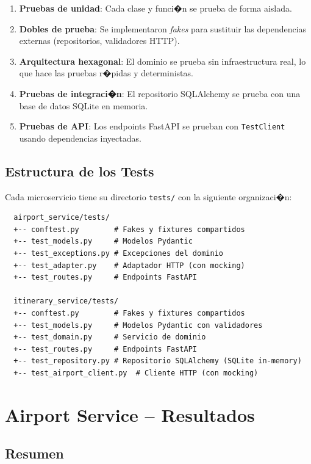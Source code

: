 \documentclass[12pt,a4paper]{article}
\begin{document}
\begin{enumerate}
  \item \textbf{Pruebas de unidad}: Cada clase y funci�n se prueba de forma aislada.
  \item \textbf{Dobles de prueba}: Se implementaron \textit{fakes} para sustituir
        las dependencias externas (repositorios, validadores HTTP).
  \item \textbf{Arquitectura hexagonal}: El dominio se prueba sin infraestructura
        real, lo que hace las pruebas r�pidas y deterministas.
  \item \textbf{Pruebas de integraci�n}: El repositorio SQLAlchemy se prueba con
        una base de datos SQLite en memoria.
  \item \textbf{Pruebas de API}: Los endpoints FastAPI se prueban con
        \texttt{TestClient} usando dependencias inyectadas.
\end{enumerate}

\subsection{Estructura de los Tests}

Cada microservicio tiene su directorio \texttt{tests/} con la siguiente organizaci�n:

\begin{verbatim}
  airport_service/tests/
  +-- conftest.py        # Fakes y fixtures compartidos
  +-- test_models.py     # Modelos Pydantic
  +-- test_exceptions.py # Excepciones del dominio
  +-- test_adapter.py    # Adaptador HTTP (con mocking)
  +-- test_routes.py     # Endpoints FastAPI

  itinerary_service/tests/
  +-- conftest.py        # Fakes y fixtures compartidos
  +-- test_models.py     # Modelos Pydantic con validadores
  +-- test_domain.py     # Servicio de dominio
  +-- test_routes.py     # Endpoints FastAPI
  +-- test_repository.py # Repositorio SQLAlchemy (SQLite in-memory)
  +-- test_airport_client.py  # Cliente HTTP (con mocking)
\end{verbatim}

\section{Airport Service -- Resultados}

\subsection{Resumen}
\end{document}
